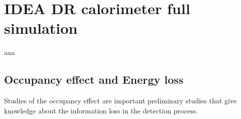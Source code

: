 \chapter{IDEA DR calorimeter full simulation}
aaa

\section{Occupancy effect and Energy loss}
Studies of the occupancy effect are important preliminary studies that give knowledge about the information loss in the detection process.\\